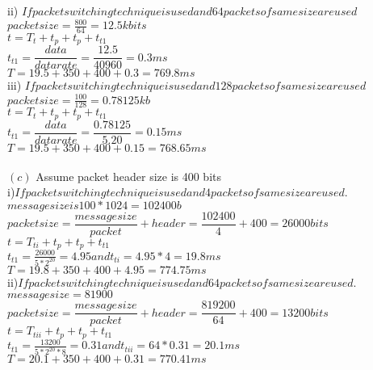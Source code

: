 \documentclass[a4paper,12pt]{article}
\begin{document}
ii) $If packet switching technique is used and 64 packets of same size are used $\\

$ packet size =\frac{800}{64}=12.5kbits $\\
$ t = T_{t}+t_{p}+t_{p}+t_{t1}$\\
$ t_{t1}=\dfrac{data}{data rate}=\dfrac{12.5}{40960}=0.3 ms $\\
$ T = 19.5+350+400+0.3=769.8ms $\\


iii) $If packet switching technique is used and 128 packets of same size are used $\\

$ packet size =\frac{100}{128}=0.78125kb $\\
$ t = T_{t}+t_{p}+t_{p}+t_{t1}$\\
$ t_{t1}=\dfrac{data}{data rate}=\dfrac{0.78125}{5.20}=0.15 ms $\\
$ T = 19.5+350+400+0.15=768.65ms $\\\\




$ (c)$ Assume packet header size is 400 bits\\
i)$ If packet switching technique is used and 4 packets of same size are used. $\\

$ message size is 100*1024=102400 b $\\
$ packet size=\dfrac{message size}{packet}+header=\dfrac{102400}{4}+400=26000 bits $\\
$ t = T_{ti}+t_{p}+t_{p}+t_{t1}$\\
$ t_{t1}=\frac{26000}{5*2^{20}}=4.95 and t_{ti}=4.95*4=19.8 ms $\\
$ T = 19.8+350+400+4.95=774.75 ms $\\

ii)$ If packet switching technique is used and 64 packets of same size are used. $\\

$ message size = 81900 $\\
$ packet size=\dfrac{message size}{packet}+header=\dfrac{819200}{64}+400=13200 bits $\\
$ t = T_{tii}+t_{p}+t_{p}+t_{t1}$\\
$ t_{t1}=\frac{13200}{5*2^{20}*8}=0.31 and t_{tii}=64*0.31=20.1 ms $\\
$ T = 20.1+350+400+0.31=770.41 ms $\\
\end{document}
